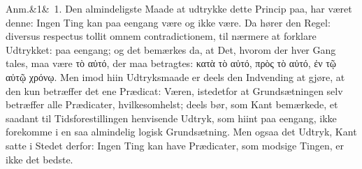 \documentclass[12pt]{book}
\def\sperr#1{#1}%
\def\textit#1{#1}%
\def\emph#1{#1}%
\newcommand{\sperr}[1]{\textls[180]{#1}}
\newcommand{\anm}[1]{%
  \par\vspace{0.5\baselineskip}%
  \noindent\hspace{\parindent}\sperr{Anm.}\ifx&#1&\else~\textit{#1}.\fi
  \enspace\ignorespaces
}
\newcommand{\opage}[1]{\marginnote{\footnotesize\textit{[#1]}}}
\begin{document}
\anm{1} Den almindeligste Maade at udtrykke dette Princip paa, har været denne:
\emph{Ingen Ting kan paa eengang være og ikke være.} Da hører den Regel:
\textit{diversus respectus tollit omnem contradictionem}, til nærmere at
forklare
\opage{316} Udtrykket: \emph{paa eengang}; og det bemærkes da, at Det, hvorom der hver Gang
tales, maa være \textit{τὸ αὐτό}, der maa betragtes: \textit{κατὰ τὸ αὐτό,
πρὸς τὸ αὐτό, ἐν τῷ αὐτῷ χρόνῳ}. Men imod hiin Udtryksmaade er deels den
Indvending at gjøre, at den kun betræffer det ene Prædicat: \emph{Væren},
istedetfor at Grundsætningen selv betræffer alle Prædicater, hvilkesomhelst;
deels bør, som Kant bemærkede, et saadant til Tidsforestillingen henvisende
Udtryk, som hiint \emph{paa eengang}, ikke forekomme i en saa almindelig logisk
Grundsætning. Men ogsaa det Udtryk, Kant satte i Stedet derfor: Ingen Ting kan
have Prædicater, som modsige Tingen, er ikke det bedste.
\end{document}
